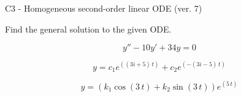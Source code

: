 \begin{exercise}
  \begin{exerciseTitle}C3 - Homogeneous second-order linear ODE (ver. 7)\end{exerciseTitle}
  \begin{exerciseStatement}
    
Find the general solution to the given ODE.

    
\[y''-10y'+34y = 0\]

  \end{exerciseStatement}
  \begin{exerciseAnswer}
    
\[y= c_{1} e^{\left(\left(3 i + 5\right) \, t\right)} + c_{2} e^{\left(-\left(3 i - 5\right) \, t\right)}\]

    
\[y= {\left(k_{1} \cos\left(3 \, t\right) + k_{2} \sin\left(3 \, t\right)\right)} e^{\left(5 \, t\right)}\]

  \end{exerciseAnswer}
\end{exercise}